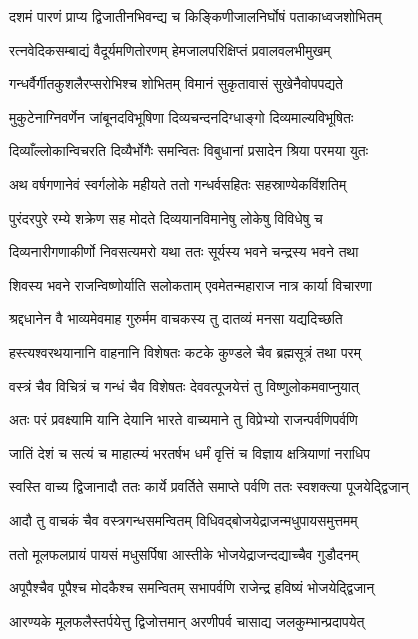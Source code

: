 \twolineshloka
{दशमं पारणं प्राप्य द्विजातीनभिवन्द्य च}
{किङ्किणीजालनिर्घोषं पताकाध्वजशोभितम्}


\twolineshloka
{रत्नवेदिकसम्बाद्यं वैदूर्यमणितोरणम्}
{हेमजालपरिक्षिप्तं प्रवालवलभीमुखम्}


\twolineshloka
{गन्धर्वैर्गीतकुशलैरप्सरोभिश्च शोभितम्}
{विमानं सुकृतावासं सुखेनैवोपपद्यते}


\twolineshloka
{मुकुटेनाग्निवर्णेन जांबूनदविभूषिणा}
{दिव्यचन्दनदिग्धाङ्गो दिव्यमाल्यविभूषितः}


\twolineshloka
{दिव्याँल्लोकान्विचरति दिव्यैर्भोगैः समन्वितः}
{विबुधानां प्रसादेन श्रिया परमया युतः}


\twolineshloka
{अथ वर्षगणानेवं स्वर्गलोके महीयते}
{ततो गन्धर्वसहितः सहस्राण्येकविंशतिम्}


\twolineshloka
{पुरंदरपुरे रम्ये शक्रेण सह मोदते}
{दिव्ययानविमानेषु लोकेषु विविधेषु च}


\twolineshloka
{दिव्यनारीगणाकीर्णो निवसत्यमरो यथा}
{ततः सूर्यस्य भवने चन्द्रस्य भवने तथा}


\threelineshloka
{शिवस्य भवने राजन्विष्णोर्याति सलोकताम्}
{एवमेतन्महाराज नात्र कार्या विचारणा}
{}


\twolineshloka
{श्रद्दधानेन वै भाव्यमेवमाह गुरुर्मम}
{वाचकस्य तु दातव्यं मनसा यद्यदिच्छति}


\twolineshloka
{हस्त्यश्वरथयानानि वाहनानि विशेषतः}
{कटके कुण्डले चैव ब्रह्मसूत्रं तथा परम्}


\twolineshloka
{वस्त्रं चैव विचित्रं च गन्धं चैव विशेषतः}
{देववत्पूजयेत्तं तु विष्णुलोकमवाप्नुयात्}


\twolineshloka
{अतः परं प्रवक्ष्यामि यानि देयानि भारते}
{वाच्यमाने तु विप्रेभ्यो राजन्पर्वणिपर्वणि}


\twolineshloka
{जातिं देशं च सत्यं च माहात्म्यं भरतर्षभ}
{धर्मं वृत्तिं च विज्ञाय क्षत्रियाणां नराधिप}


\twolineshloka
{स्वस्ति वाच्य द्विजानादौ ततः कार्ये प्रवर्तिते}
{समाप्ते पर्वणि ततः स्वशक्त्या पूजयेद्द्विजान्}


\twolineshloka
{आदौ तु वाचकं चैव वस्त्रगन्धसमन्वितम्}
{विधिवद्बोजयेद्राजन्मधुपायसमुत्तमम्}


\twolineshloka
{ततो मूलफलप्रायं पायसं मधुसर्पिषा}
{आस्तीके भोजयेद्राजन्दद्याच्चैव गुडौदनम्}


\twolineshloka
{अपूपैश्चैव पूपैश्च मोदकैश्च समन्वितम्}
{सभापर्वणि राजेन्द्र हविष्यं भोजयेद्द्विजान्}


\twolineshloka
{आरण्यके मूलफलैस्तर्पयेत्तु द्विजोत्तमान्}
{अरणीपर्व चासाद्य जलकुम्भान्प्रदापयेत्}


